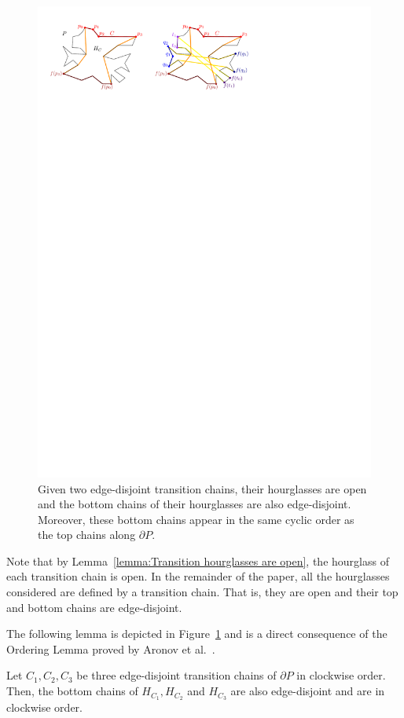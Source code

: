 \documentclass[a4paper,UKenglish]{lipics}
\begin{document}
\begin{figure}[tb]
\centering
\includegraphics{img/TransitionChains.pdf}
\caption{\small Given two edge-disjoint transition chains, their hourglasses are open and
the bottom chains of their hourglasses are also edge-disjoint. 
Moreover, these bottom chains appear in the same cyclic order as the top chains along $\partial P$.}
\label{fig:Transition chains and hourglasses}
\end{figure}

Note that by Lemma~\ref{lemma:Transition hourglasses are open}, the hourglass of each transition chain is open.
In the remainder of the paper, all the hourglasses considered are defined by a transition chain. That is, they are open and their top and bottom chains are edge-disjoint.

The following lemma is depicted in Figure~\ref{fig:Transition chains and hourglasses} and is a direct consequence of the Ordering Lemma proved by Aronov et al.~\cite[Corollary 2.7.4]{aronov1993furthest}.
\begin{lemma}\label{lemma:Ordering Lemma}
Let $C_1, C_2, C_3$ be three edge-disjoint transition chains of $\partial P$ in clockwise order. Then, the bottom chains of $H_{C_1}, H_{C_2}$ and $H_{C_3}$ are also edge-disjoint and are in clockwise order.
\end{lemma}
\end{document}
